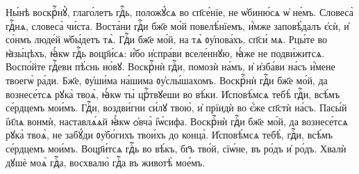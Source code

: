 \label{prochimensunday}

%
 Ны́нѣ воскрⷭ҇нꙋ̀, глаго́летъ гдⷭ҇ь,  положꙋ́сѧ во сп҃се́нїе, не ѡ҆биню́сѧ ѡ҆ не́мъ.   Словеса̀ гдⷭ҇нѧ, словеса̀ чи́ста. 
%
 Воста́ни гдⷭ҇и бж҃е мо́й  повелѣ́нїемъ, и҆́мже заповѣ́далъ є҆сѝ, и҆ со́нмъ люде́й  ѡ҆бы́детъ тѧ̀.  Гдⷭ҇и бж҃е мо́й, на тѧ̀ ᲂу҆пова́хъ,  сп҃си́ мѧ. 
%
 Рцы́те во ꙗ҆зы́цѣхъ, ꙗ҆́кѡ гдⷭ҇ь  воцр҃и́сѧ: и҆́бо и҆спра́ви вселе́ннꙋю, ꙗ҆́же не  подви́житсѧ.  Воспо́йте гдⷭ҇еви пѣ́снь но́вꙋ. 
%
 Воскрⷭ҇нѝ гдⷭ҇и, помозѝ на́мъ, и҆  и҆зба́ви на́съ и҆́мене твоегѡ̀ ра́ди.  Бж҃е,  ᲂу҆ши́ма на́шима ᲂу҆слы́шахомъ.  
%
 Воскрⷭ҇нѝ гдⷭ҇и бж҃е мо́й, да  вознесе́тсѧ рꙋка̀ твоѧ̀, ꙗ҆́кѡ ты̀ црⷭ҇твꙋеши во вѣ́ки.   И҆сповѣ́мсѧ тебѣ̀ гдⷭ҇и, всѣ́мъ се́рдцемъ мои́мъ. 
%
 Гдⷭ҇и, воздви́гни си́лꙋ твою̀, и҆  прїидѝ во є҆́же сп҃стѝ на́съ.  Пасы́й і҆и҃лѧ  вонмѝ, наставлѧ́ѧй ꙗ҆́кѡ ѻ҆вча̀ і҆ѡ́сифа. 
%
 Воскрⷭ҇нѝ гдⷭ҇и бж҃е мо́й, да  вознесе́тсѧ рꙋка̀ твоѧ̀, не забꙋ́ди ᲂу҆бо́гихъ твои́хъ до  конца̀.  И҆сповѣ́мсѧ тебѣ̀, гдⷭ҇и, всѣ́мъ  се́рдцемъ мои́мъ.  
%
 Воцр҃и́тсѧ гдⷭ҇ь во вѣ́къ, бг҃ъ  тво́й, сїѡ́не, въ ро́дъ и҆ ро́дъ.  Хвалѝ дꙋшѐ моѧ̀  гдⷭ҇а, восхвалю̀ гдⷭ҇а въ животѣ̀ мое́мъ. 
